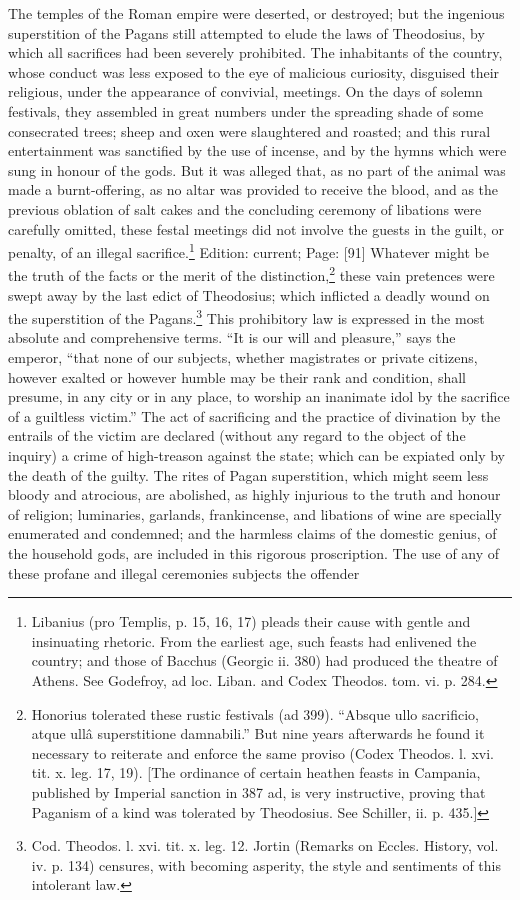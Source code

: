 The temples of the Roman empire were deserted, or destroyed; but the ingenious superstition of the Pagans still attempted to elude the laws of Theodosius, by which all sacrifices had been severely prohibited. The inhabitants of the country, whose conduct was less exposed to the eye of malicious curiosity, disguised their religious, under the appearance of convivial, meetings. On the days of solemn festivals, they assembled in great numbers under the spreading shade of some consecrated trees; sheep and oxen were slaughtered and roasted; and this rural entertainment was sanctified by the use of incense, and by the hymns which were sung in honour of the gods. But it was alleged that, as no part of the animal was made a burnt-offering, as no altar was provided to receive the blood, and as the previous oblation of salt cakes and the concluding ceremony of libations were carefully omitted, these festal meetings did not involve the guests in the guilt, or penalty, of an illegal sacrifice.\footnote{Libanius (pro Templis, p. 15, 16, 17) pleads their cause with gentle and insinuating rhetoric. From the earliest age, such feasts had enlivened the country; and those of Bacchus (Georgic ii. 380) had produced the theatre of Athens. See Godefroy, ad loc. Liban. and Codex Theodos. tom. vi. p. 284.} Edition: current; Page: [91] Whatever might be the truth of the facts or the merit of the distinction,\footnote{Honorius tolerated these rustic festivals (ad 399). \texthebrew{“}Absque ullo sacrificio, atque ullâ superstitione damnabili.\texthebrew{}” But nine years afterwards he found it necessary to reiterate and enforce the same proviso (Codex Theodos. l. xvi. tit. x. leg. 17, 19). [The ordinance of certain heathen feasts in Campania, published by Imperial sanction in 387 ad, is very instructive, proving that Paganism of a kind was tolerated by Theodosius. See Schiller, ii. p. 435.]} these vain pretences were swept away by the last edict of Theodosius; which inflicted a deadly wound on the superstition of the Pagans.\footnote{Cod. Theodos. l. xvi. tit. x. leg. 12. Jortin (Remarks on Eccles. History, vol. iv. p. 134) censures, with becoming asperity, the style and sentiments of this intolerant law.} This prohibitory law is expressed in the most absolute and comprehensive terms. \texthebrew{“}It is our will and pleasure,\texthebrew{}” says the emperor, \texthebrew{“}that none of our subjects, whether magistrates or private citizens, however exalted or however humble may be their rank and condition, shall presume, in any city or in any place, to worship an inanimate idol by the sacrifice of a guiltless victim.\texthebrew{}” The act of sacrificing and the practice of divination by the entrails of the victim are declared (without any regard to the object of the inquiry) a crime of high-treason against the state; which can be expiated only by the death of the guilty. The rites of Pagan superstition, which might seem less bloody and atrocious, are abolished, as highly injurious to the truth and honour of religion; luminaries, garlands, frankincense, and libations of wine are specially enumerated and condemned; and the harmless claims of the domestic genius, of the household gods, are included in this rigorous proscription. The use of any of these profane and illegal ceremonies subjects the offender 